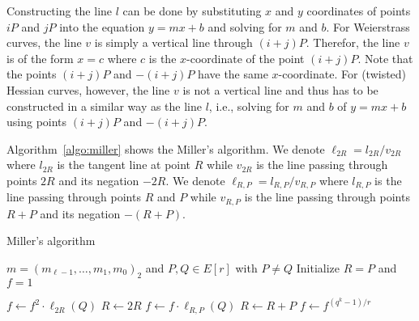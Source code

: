 Constructing the line $l$ can be done by substituting $x$ and $y$ coordinates of points $iP$ and $jP$
into the equation $y = mx + b$ and solving for $m$ and $b$.
For Weierstrass curves, the line $v$ is simply a vertical line through $(i+j)P$.
Therefor, the line $v$ is of the form $x = c$ where $c$ is the $x$-coordinate of the point $(i+j)P$.
Note that the points $(i+j)P$ and $-(i+j)P$ have the same $x$-coordinate.
For (twisted) Hessian curves, however, the line $v$ is not a vertical line
and thus has to be constructed in a similar way as the line $l$,
i.e., solving for $m$ and $b$ of $y = mx + b$ using points $(i+j)P$ and $-(i+j)P$.

Algorithm~\ref{algo:miller} shows the Miller's algorithm.
We denote $\ell_{2R} = l_{2R} / v_{2R}$ where $l_{2R}$ is the tangent line at point $R$
while $v_{2R}$ is the line passing through points $2R$ and its negation $-2R$.
We denote $\ell_{R,P} = l_{R,P} / v_{R,P}$ where $l_{R,P}$ is the line passing through points $R$ and $P$
while $v_{R,P}$ is the line passing through points $R+P$ and its negation $-(R+P)$.

\begin{algorithm}
\caption{Miller's algorithm}
\label{algo:miller}
\begin{algorithmic}[1]

	\Require $m = (m_{\ell-1}, \dots, m_1, m_0)_2$ and $P,Q \in E[r]$ with $P \ne Q$
	\State Initialize $R = P$ and $f = 1$

		\State $f \leftarrow f^2 \cdot \ell_{2R}(Q)$
		\State $R \leftarrow 2R$
			\State $f \leftarrow f \cdot \ell_{R,P}(Q)$
			\State $R \leftarrow R+P$
		\EndIf
	\EndFor
	\State $f \leftarrow f^{(q^k-1)/r}$

\end{algorithmic}
\end{algorithm}

